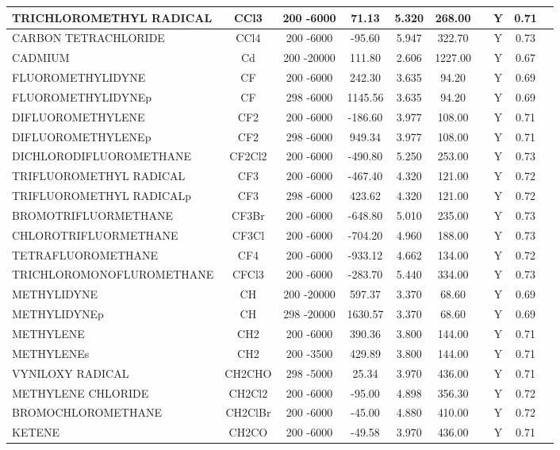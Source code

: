 \begin{longtable}{@{\extracolsep{\fill}}|l|c|c|c|c|c|c|c|c|l|}
TRICHLOROMETHYL RADICAL&CCl3&200 -6000&   71.13& 5.320&   268.00& &Y& 0.71&\\ \hline
CARBON TETRACHLORIDE&CCl4&200 -6000&  -95.60& 5.947&   322.70& &Y& 0.73&\\ \hline
CADMIUM&Cd&200 -20000&  111.80& 2.606&  1227.00& &Y& 0.67&\\ \hline
FLUOROMETHYLIDYNE&CF&200 -6000&  242.30& 3.635&    94.20& &Y& 0.69&\\ \hline
FLUOROMETHYLIDYNEp&CF&298 -6000& 1145.56& 3.635&    94.20& &Y& 0.69&\\ \hline
DIFLUOROMETHYLENE&CF2&200 -6000& -186.60& 3.977&   108.00& &Y& 0.71&\\ \hline
DIFLUOROMETHYLENEp&CF2&298 -6000&  949.34& 3.977&   108.00& &Y& 0.71&\\ \hline
DICHLORODIFLUOROMETHANE&CF2Cl2&200 -6000& -490.80& 5.250&   253.00& &Y& 0.73&\\ \hline
TRIFLUOROMETHYL RADICAL&CF3&200 -6000& -467.40& 4.320&   121.00& &Y& 0.72&\\ \hline
TRIFLUOROMETHYL RADICALp&CF3&298 -6000&  423.62& 4.320&   121.00& &Y& 0.72&\\ \hline
BROMOTRIFLUORMETHANE&CF3Br&200 -6000& -648.80& 5.010&   235.00& &Y& 0.73&\\ \hline
CHLOROTRIFLUORMETHANE&CF3Cl&200 -6000& -704.20& 4.960&   188.00& &Y& 0.73&\\ \hline
TETRAFLUOROMETHANE&CF4&200 -6000& -933.12& 4.662&   134.00& &Y& 0.72&\\ \hline
TRICHLOROMONOFLUROMETHANE&CFCl3&200 -6000& -283.70& 5.440&   334.00& &Y& 0.73&\\ \hline
METHYLIDYNE&CH&200 -20000&  597.37& 3.370&    68.60& &Y& 0.69&\\ \hline
METHYLIDYNEp&CH&298 -20000& 1630.57& 3.370&    68.60& &Y& 0.69&\\ \hline
METHYLENE&CH2&200 -6000&  390.36& 3.800&   144.00& &Y& 0.71&\\ \hline
METHYLENEs&CH2&200 -3500&  429.89& 3.800&   144.00& &Y& 0.71&\\ \hline
VYNILOXY RADICAL&CH2CHO&298 -5000&   25.34& 3.970&   436.00& &Y& 0.71&\\ \hline
METHYLENE CHLORIDE&CH2Cl2&200 -6000&  -95.00& 4.898&   356.30& &Y& 0.72&\\ \hline
BROMOCHLOROMETHANE&CH2ClBr&200 -6000&  -45.00& 4.880&   410.00& &Y& 0.72&\\ \hline
KETENE&CH2CO&200 -6000&  -49.58& 3.970&   436.00& &Y& 0.71&\\ \hline

\end{longtable}
